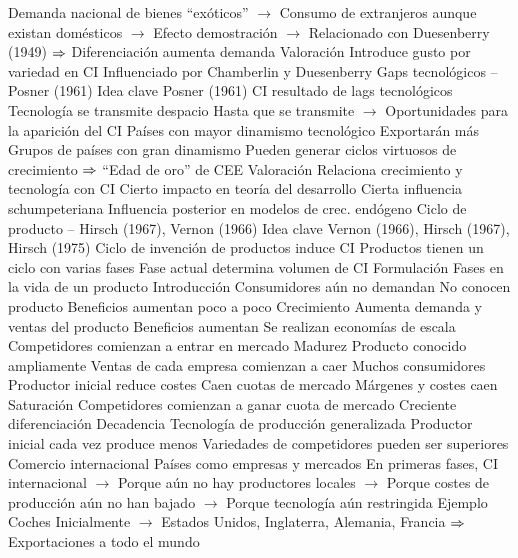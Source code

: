 \documentclass{nuevotema}
\begin{document}
\begin{esquemal}
				\4[] Demanda nacional de bienes ``exóticos''
				\4[] $\to$ Consumo de extranjeros aunque existan domésticos
				\4[] $\to$ Efecto demostración
				\4[] $\to$ Relacionado con Duesenberry (1949)
				\4[] $\Rightarrow$ Diferenciación aumenta demanda
			\3 Valoración
				\4 Introduce gusto por variedad en CI
				\4 Influenciado por Chamberlin y Duesenberry
		\2 Gaps tecnológicos -- Posner (1961)
			\3 Idea clave
				\4 Posner (1961)
				\4 CI resultado de lags tecnológicos
				\4[] Tecnología se transmite despacio
				\4[] Hasta que se transmite
				\4[] $\to$ Oportunidades para la aparición del CI
				\4 Países con mayor dinamismo tecnológico
				\4[] Exportarán más
				\4 Grupos de países con gran dinamismo
				\4[] Pueden generar ciclos virtuosos de crecimiento
				\4[] $\Rightarrow$ ``Edad de oro'' de CEE
			\3 Valoración
				\4 Relaciona crecimiento y tecnología con CI
				\4 Cierto impacto en teoría del desarrollo
				\4 Cierta influencia schumpeteriana
				\4[] Influencia posterior en modelos de crec. endógeno
		\2 Ciclo de producto -- Hirsch (1967), Vernon (1966)
			\3 Idea clave
				\4 Vernon (1966), Hirsch (1967), Hirsch (1975)
				\4 Ciclo de invención de productos induce CI
				\4 Productos tienen un ciclo con varias fases
				\4 Fase actual determina volumen de CI
			\3 Formulación
				\4 Fases en la vida de un producto
				\4[1] Introducción
				\4[] Consumidores aún no demandan
				\4[] No conocen producto
				\4[] Beneficios aumentan poco a poco
				\4[2] Crecimiento
				\4[] Aumenta demanda y ventas del producto
				\4[] Beneficios aumentan
				\4[] Se realizan economías de escala
				\4[] Competidores comienzan a entrar en mercado
				\4[3] Madurez
				\4[] Producto conocido ampliamente
				\4[] Ventas de cada empresa comienzan a caer
				\4[] Muchos consumidores
				\4[] Productor inicial reduce costes
				\4[] Caen cuotas de mercado
				\4[] Márgenes y costes caen
				\4[4] Saturación
				\4[] Competidores comienzan a ganar cuota de mercado
				\4[] Creciente diferenciación
				\4[5] Decadencia
				\4[] Tecnología de producción generalizada
				\4[] Productor inicial cada vez produce menos
				\4[] Variedades de competidores pueden ser superiores
				\4 Comercio internacional
				\4[] Países como empresas y mercados
				\4[] En primeras fases, CI internacional
				\4[] $\to$ Porque aún no hay productores locales
				\4[] $\to$ Porque costes de producción aún no han bajado
				\4[] $\to$ Porque tecnología aún restringida
				\4 Ejemplo
				\4[] Coches
				\4[] Inicialmente
				\4[] $\to$ Estados Unidos, Inglaterra, Alemania, Francia
				\4[] $\Rightarrow$ Exportaciones a todo el mundo

\end{esquemal}
\end{document}
